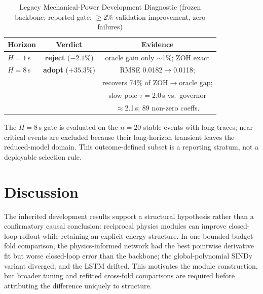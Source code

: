 \documentclass[journal]{IEEEtran}
\begin{document}
\begin{table}[!t]
\caption{Legacy Mechanical-Power Development Diagnostic (frozen backbone;
reported gate: $\geq$2\% validation improvement, zero failures)}
\label{tab:pm}
\centering
\begin{tabular}{lcc}
\toprule
Horizon & Verdict & Evidence \\
\midrule
$H{=}1$\,s  & \textbf{reject} ($-2.1\%$) & oracle gain only $\sim$1\%; ZOH exact \\
$H{=}8$\,s  & \textbf{adopt} ($+35.3\%$) & RMSE 0.0182$\rightarrow$0.0118; \\
           &  & recovers 74\% of ZOH$\rightarrow$oracle gap; \\
           &  & slow pole $\tau{=}2.0$\,s vs.\ governor \\
           &  & $\approx$2.1\,s; 89 non-zero coeffs. \\
\bottomrule
\end{tabular}
\vspace{0.2em}
\footnotesize The $H{=}8$\,s gate is evaluated on the $n{=}20$ stable events
with long traces; near-critical events are excluded because their long-horizon
transient leaves the reduced-model domain. This outcome-defined subset is a
reporting stratum, not a deployable selection rule.
\end{table}

\section{Discussion}
\label{sec:discussion}

The inherited development results support a structural hypothesis rather than
a confirmatory causal conclusion: reciprocal physics modules can improve
closed-loop rollout while retaining an explicit energy structure. In one
bounded-budget fold comparison, the physics-informed network had the best
pointwise derivative fit but worse closed-loop error than the backbone; the
global-polynomial SINDy variant diverged; and the LSTM drifted. This motivates
the module construction, but broader tuning and refitted cross-fold comparisons
are required before attributing the difference uniquely to structure.
\end{document}
